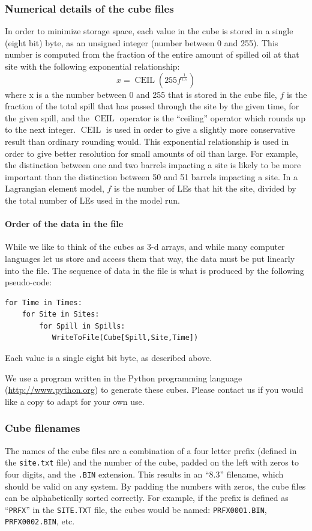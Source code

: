 \documentclass[12pt]{article}      %
\newcommand{\filename}[1]{\texttt{#1}}
\newcommand{\command}[1]{\texttt{#1}}
\begin{document}
\subsubsection{Numerical details of the cube files}
In order to minimize storage space, each value in the cube is stored 
in a single (eight bit) byte, as an unsigned integer (number between 0 and 255). 
This number is computed from the fraction of the entire amount of spilled oil 
at that site with the following exponential relationship:
\begin{equation}
x = \operatorname{CEIL}(255f^{\frac{1}{1.5}})
\end{equation}
where x is a the number between 0 and 255 that is stored in the cube 
file, $f$ is the fraction of the total spill that has passed through 
the site by the given time, for the given spill, and the $\operatorname{CEIL}$ 
operator is the ``ceiling'' operator which rounds up to the next 
integer. $\operatorname{CEIL}$ is used in order to give a slightly 
more conservative result than ordinary rounding would. This 
exponential relationship is used in order to give better resolution 
for small amounts of oil than large. For example, the distinction 
between one and two barrels impacting a site is likely to be more 
important than the distinction between 50 and 51 barrels impacting a 
site. In a Lagrangian element model, $f$ is the number of LEs that 
hit the site, divided by the total number of LEs used in the model run.

\paragraph{Order of the data in the file}
While we like to think of the cubes as 3-d arrays, and while many computer 
languages let us store and access them that way, the data must be put 
linearly into the file. The sequence of data in the file is what is 
produced by the following pseudo-code:
\begin{verbatim}
for Time in Times:          
    for Site in Sites:
        for Spill in Spills:
           WriteToFile(Cube[Spill,Site,Time])
\end{verbatim}
Each value is a single eight bit byte, as described above.

We use a program written in the Python programming language
(\url{http://www.python.org}) to generate these cubes. Please contact us 
if you would like a copy to adapt for your own use.


\subsubsection{Cube filenames}
The names of the cube files are a combination of a four letter prefix (defined 
in the \filename{site.txt} file) and the number of the cube, padded 
on the left with zeros to four digits, and the \filename{.BIN} 
extension. This results in an ``8.3'' filename, which should be valid 
on any system. By padding the numbers with zeros, the cube files can 
be alphabetically sorted correctly. For example, if the prefix is
defined as ``\command{PRFX}'' in the \filename{SITE.TXT} file, the
cubes would be named: \filename{PRFX0001.BIN}, \filename{PRFX0002.BIN}, etc.
\end{document}
